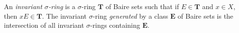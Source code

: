 An \emph{invariant $\sigma$-ring} is a $\sigma$-ring $\mathbf{T}$ of Baire sets such that if $E \in \mathbf{T}$ and $x \in X$, then $xE \in \mathbf{T}$. The invariant $\sigma$-ring \emph{generated} by a class $\mathbf{E}$ of Baire sets is the intersection of all invariant $\sigma$-rings containing $\mathbf{E}$.